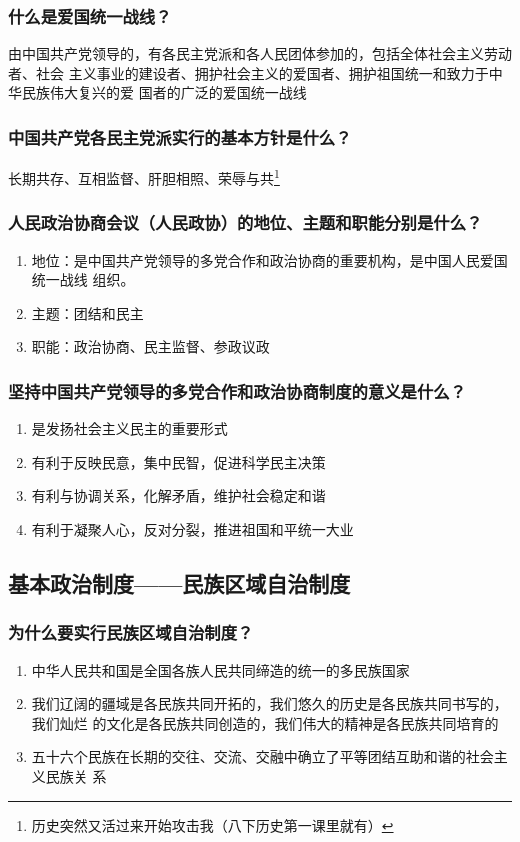 \documentclass[11pt]{article}
\begin{document}
\subsubsection{什么是爱国统一战线？}
\label{sec:org05907e0}
由中国共产党领导的，有各民主党派和各人民团体参加的，包括全体社会主义劳动者、社会
主义事业的建设者、拥护社会主义的爱国者、拥护祖国统一和致力于中华民族伟大复兴的爱
国者的广泛的爱国统一战线
\subsubsection{中国共产党各民主党派实行的基本方针是什么？}
\label{sec:orgb7b820b}
长期共存、互相监督、肝胆相照、荣辱与共\footnote{历史突然又活过来开始攻击我（八下历史第一课里就有）}
\subsubsection{人民政治协商会议（人民政协）的地位、主题和职能分别是什么？}
\label{sec:org7337f37}
\begin{enumerate}
\item 地位：是中国共产党领导的多党合作和政治协商的重要机构，是中国人民爱国统一战线
组织。
\item 主题：团结和民主
\item 职能：政治协商、民主监督、参政议政
\end{enumerate}
\subsubsection{坚持中国共产党领导的多党合作和政治协商制度的意义是什么？}
\label{sec:org5e705a4}
\begin{enumerate}
\item 是发扬社会主义民主的重要形式
\item 有利于反映民意，集中民智，促进科学民主决策
\item 有利与协调关系，化解矛盾，维护社会稳定和谐
\item 有利于凝聚人心，反对分裂，推进祖国和平统一大业
\end{enumerate}
\subsection{基本政治制度——民族区域自治制度}
\label{sec:org36bdb56}
\subsubsection{为什么要实行民族区域自治制度？}
\label{sec:orgb73fe2f}
\begin{enumerate}
\item 中华人民共和国是全国各族人民共同缔造的统一的多民族国家
\item 我们辽阔的疆域是各民族共同开拓的，我们悠久的历史是各民族共同书写的，我们灿烂
的文化是各民族共同创造的，我们伟大的精神是各民族共同培育的
\item 五十六个民族在长期的交往、交流、交融中确立了平等团结互助和谐的社会主义民族关
系
\end{enumerate}
\end{document}
